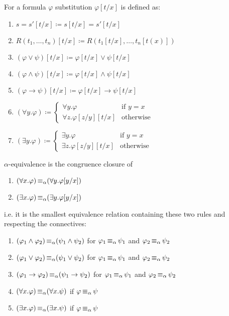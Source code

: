 \begin{defi}
    For a formula $\varphi$ \alert{substitution $\varphi[t/x]$} is defined as: 
    \begin{enumerate}
        \item $s = s'[t/x] \coloneq s[t/x] = s'[t/x]$
        \item $R(t_1, \dots, t_n)[t/x] \coloneq R(t_1[t/x], \dots, t_n[t(x)])$
        \item $(\varphi \lor \psi)[t/x] \coloneq \varphi[t/x] \lor \psi[t/x]$
        \item $(\varphi \wedge \psi)[t/x] \coloneq \varphi[t/x] \wedge \psi[t/x]$
        \item $(\varphi \to \psi)[t/x] \coloneq \varphi[t/x] \to \psi[t/x]$
        \item {$ (\forall y. \varphi) \coloneq 
            \begin{cases}
                \forall y. \varphi & \text{if } y = x \\
                \forall z. \varphi[z/y][t/x] & \text{otherwise}
            \end{cases}$}
        \item {$ (\exists y. \varphi) \coloneq 
        \begin{cases}
            \exists y. \varphi & \text{if } y = x \\
            \exists z. \varphi[z/y][t/x] & \text{otherwise}
        \end{cases}$}
    \end{enumerate}
\end{defi}

\begin{defi}
    \alert{$\alpha$-equivalence} is the \alert{congruence closure} of 
    \begin{enumerate}
        \item $(\forall x. \varphi) \operatorname{\equiv_{\alpha}} (\forall y. \varphi[y/x])$
        \item $(\exists x. \varphi) \operatorname{\equiv_{\alpha}} (\exists y. \varphi[y/x])$
    \end{enumerate}
    i.e. it is the smallest equivalence relation containing these two rules and respecting the connectives: 
    \begin{enumerate}
        \item $(\varphi_1 \wedge \varphi_2) \operatorname{\equiv_{\alpha}} (\psi_1 \wedge \psi_2)$ for $\varphi_1 \operatorname{\equiv_{\alpha}} \psi_1$ and $\varphi_2 \operatorname{\equiv_{\alpha}} \psi_2$
        \item $(\varphi_1 \lor \varphi_2) \operatorname{\equiv_{\alpha}} (\psi_1 \lor \psi_2)$ for $\varphi_1 \operatorname{\equiv_{\alpha}} \psi_1$ and $\varphi_2 \operatorname{\equiv_{\alpha}} \psi_2$
        \item $(\varphi_1 \to \varphi_2) \operatorname{\equiv_{\alpha}} (\psi_1 \to \psi_2)$ for $\varphi_1 \operatorname{\equiv_{\alpha}} \psi_1$ and $\varphi_2 \operatorname{\equiv_{\alpha}} \psi_2$
        \item $(\forall x. \varphi) \operatorname{\equiv_{\alpha}} (\forall x. \psi)$ if $\varphi \operatorname{\equiv_{\alpha}} \psi$
        \item $(\exists x. \varphi) \operatorname{\equiv_{\alpha}} (\exists x. \psi)$ if $\varphi \operatorname{\equiv_{\alpha}} \psi$
    \end{enumerate}
\end{defi}

